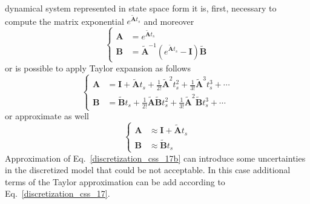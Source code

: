 \documentclass[11pt,a4paper,oneside]{book}
\numberwithin{equation}{section}
\theoremstyle{it}
\theoremstyle{definition}
\begin{document}
dynamical system represented in state space form it is, first, necessary to compute the matrix exponential $e^{\tilde{\mathbf{A}}t_s}$ and moreover
\begin{equation}\label{discretization_css_16}
	\left\lbrace \begin{aligned}
		\mathbf{A} &= e^{\tilde{\mathbf{A}}t_s} \\[6pt]
		\mathbf{B} &= \tilde{\mathbf{A}}^{-1}\left( e^{\tilde{\mathbf{A}}t_s} -\mathbf{I}\right) \tilde{\mathbf{B}}
	\end{aligned}\right. 
\end{equation}
or is possible to apply Taylor expansion as follows
\begin{equation}\label{discretization_css_17}
	\left\lbrace \begin{aligned}
		\mathbf{A} &= \mathbf{I} + {\tilde{\mathbf{A}}t_s} + 
		{\frac{1}{2!}\tilde{\mathbf{A}}^2t_s^2} + 
		{\frac{1}{3!}\tilde{\mathbf{A}}^3t_s^3} +\cdots 
		\\[6pt]
		\mathbf{B} &= \tilde{\mathbf{B}} t_s + 
		{\frac{1}{2!}\tilde{\mathbf{A}}\tilde{\mathbf{B}}t_s^2} + 
		{\frac{1}{3!}\tilde{\mathbf{A}}^2\tilde{\mathbf{B}}t_s^3} + \cdots 
	\end{aligned}\right. 
\end{equation}
or approximate as well
\begin{equation}\label{discretization_css_17b}
	\left\lbrace \begin{aligned}
		\mathbf{A} &\approx \mathbf{I} + {\tilde{\mathbf{A}}t_s} 
		\\[6pt]
		\mathbf{B} &\approx \tilde{\mathbf{B}} t_s 
	\end{aligned}\right. 
\end{equation}
Approximation of Eq.~\eqref{discretization_css_17b} can introduce some 
uncertainties in the discretized model that could be not acceptable. In this case 
additional terms of the Taylor approximation can be add according to 
Eq.~\eqref{discretization_css_17}. 
\end{document}
